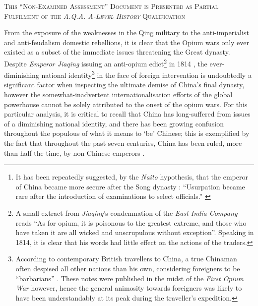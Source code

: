 \documentclass[a4paper,oneside]{article}
\newcommand{\textrule}{%
        \noindent
        \makebox[\linewidth]{
                \rule{\linewidth}{0.4pt}
        }%
}
\begin{document}
\begin{abstract}
        This essay will discuss the factors which led to the downfall of the
        greatest dynasty\footnote{It has been repeatedly suggested, by the
        \textit{Naito} hypothesis, that the emperor of China became more secure
        after the Song dynasty \autocite{Miyakawa:1955}: ``Usurpation became
        rare after the introduction of examinations to select officials.''
        \autocite{Sng:2014}} in the history of China. Also under examination
        will be the extent to which the strained international trade relations
        with the \textit{East India Company} and the ensuing Opium wars
        contributed to the ultimate demise of 1912.
\end{abstract}

\textrule%
\vspace*{0.6em}
{
        \centering \textsc{This ``Non-Examined Assessment'' Document is
        Presented as Partial Fulfilment of the \textit{A.Q.A. A-Level History}
        Qualification}\\
}
\textrule%
\vspace*{0.6em}

%
From the exposure of the weaknesses in the Qing military to the
anti-imperialist and anti-feudalism domestic rebellions, it is clear that the
Opium wars only ever existed as a subset of the immediate issues threatening
the Great dynasty. Despite \textit{Emperor Jiaqing} issuing an anti-opium
edict\footnote{A small extract from \textit{Jiaqing}'s condemnation of the
\textit{East India Company} reads ``As for opium, it is poisonous to the
greatest extreme, and those who have taken it are all wicked and unscrupulous
without exception''. Speaking in 1814, it is clear that his words had little
effect on the actions of the traders.} in 1814 \autocite{Hu:1991}, the
ever-diminishing national identity\footnote{According to contemporary British
travellers to China, a true Chinaman often despised all other nations than his
own, considering foreigners to be ``barbarians'' \autocite{McPherson:1842}.
These notes were published in the midst of the \textit{First Opium War} however,
hence the general animosity towards foreigners was likely to have been
understandably at its peak during the traveller's expedition.} in the face of
foreign intervention is undoubtedly a significant factor when inspecting the
ultimate demise of China's final dynasty, however the somewhat-inadvertent
internationalisation efforts of the global powerhouse cannot be solely
attributed to the onset of the opium wars. For this particular analysis, it is
critical to recall that China has long-suffered from issues of a diminishing
national identity, and there has been growing confusion throughout the populous
of what it means to `be' Chinese; this is exemplified by the fact that
throughout the past seven centuries, China has been ruled, more than half the
time, by non-Chinese emperors \autocite{Fairbank:1957}.
\end{document}
